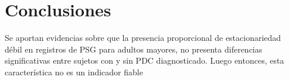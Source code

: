 
\section{Conclusiones}

Se aportan evidencias sobre que la presencia proporcional de estacionariedad d\'ebil en registros 
de PSG para adultos mayores, 
no presenta diferencias significativas entre sujetos con y sin PDC diagnosticado.
Luego entonces, esta caracter\'istica no es un indicador fiable 


